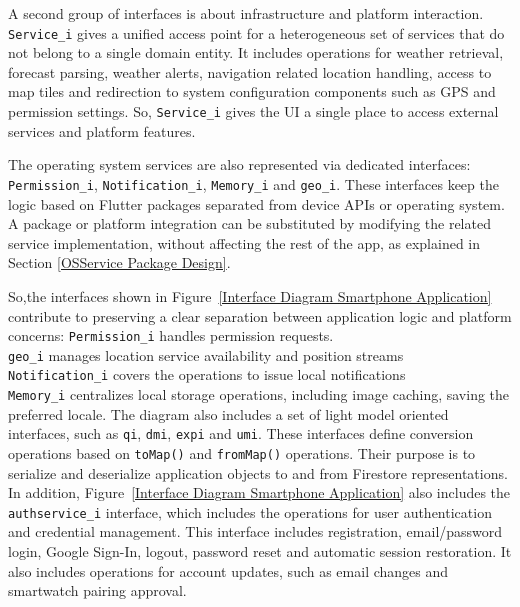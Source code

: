 A second group of interfaces is about infrastructure and platform interaction. 
\texttt{Service\_i} gives a unified access point for a heterogeneous set of services that do not belong to a single domain entity. 
It includes operations for weather retrieval, forecast parsing, weather alerts, navigation related location handling, access to map tiles and redirection to system configuration components such as GPS and permission settings. 
So, \texttt{Service\_i} gives the UI a single place to access external services and platform features.

The operating system services are also represented via dedicated interfaces: \\ \texttt{Permission\_i}, \texttt{Notification\_i}, \texttt{Memory\_i} and \texttt{geo\_i}. 
These interfaces keep the logic based on  Flutter packages separated from device APIs or operating system. 
A package or platform integration can be substituted by modifying the related service implementation, without affecting the rest of the app, as explained in Section  \ref{OSService Package Design}. 

So,the interfaces shown in Figure~\ref{Interface Diagram Smartphone Application} contribute to preserving a clear separation between application logic and platform concerns:
\texttt{Permission\_i} handles permission requests.\\
\texttt{geo\_i} manages location service availability and position streams\\
\texttt{Notification\_i} covers the operations to issue local notifications \\
 \texttt{Memory\_i} centralizes local storage operations, including image caching, saving the preferred locale.
The diagram also includes a set of light model oriented interfaces, such as  \texttt{qi}, \texttt{dmi}, \texttt{expi} and \texttt{umi}. 
These interfaces define conversion operations based on \texttt{toMap()} and \texttt{fromMap()} operations. 
Their purpose is to serialize and deserialize application objects to and from Firestore representations. 
In addition, Figure~\ref{Interface Diagram Smartphone Application} also includes the \texttt{authservice\_i} interface, which includes the operations for user authentication and credential management.
This interface includes registration, email/password login, Google Sign-In, logout, password reset and automatic session restoration. 
It also includes operations for account updates, such as email changes and smartwatch pairing approval.

